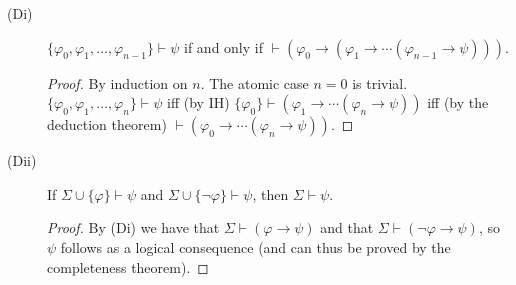 \documentclass[12pt]{article}
\newcommand{\proves}[0]{\vdash}
\begin{document}
\begin{description}
\item[(Di)] $\{ \varphi_0, \varphi_1, \dots, \varphi_{n-1} \} \proves \psi$
  if and only if $\proves (\varphi_0 \rightarrow (\varphi_1 \rightarrow
  \cdots (\varphi_{n-1} \rightarrow \psi)))$.
  \begin{proof}
    By induction on $n$.  The atomic case $n=0$ is trivial.  $\{
	\varphi_0, \varphi_1, \dots, \varphi_{n} \} \proves
	\psi$ iff (by IH) $\{ \varphi_0 \} \proves (\varphi_1 \rightarrow
	\cdots (\varphi_{n} \rightarrow \psi))$ iff (by the deduction
	theorem) $\proves (\varphi_0 \rightarrow \cdots (\varphi_n
	\rightarrow \psi))$.
  \end{proof}
\item[(Dii)] If $\Sigma \cup \{\varphi\} \proves \psi$ and $\Sigma \cup
  \{\neg\varphi\} \proves \psi$, then $\Sigma \proves \psi$.
  \begin{proof}
    By (Di) we have that $\Sigma \proves (\varphi \rightarrow \psi)$ and
	that $\Sigma \proves (\neg\varphi \rightarrow \psi)$, so $\psi$
	follows as a logical consequence (and can thus be proved by the
	completeness theorem).
  \end{proof}
\end{description}
\end{document}

